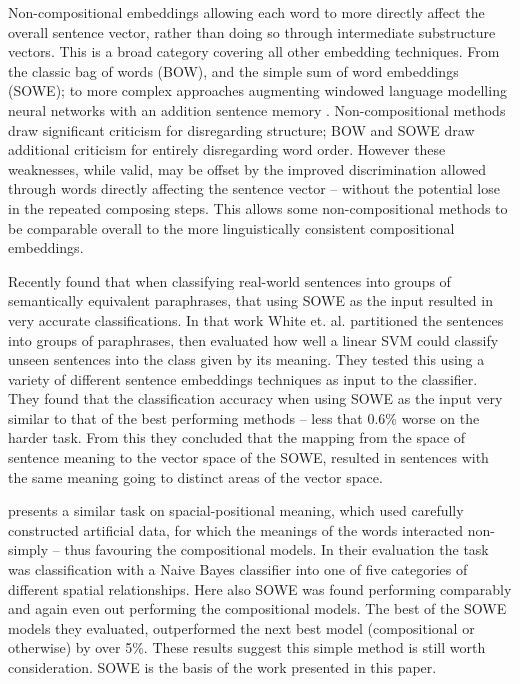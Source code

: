 \documentclass[11pt]{article}
\theoremstyle{plain}
\theoremstyle{definition}
\begin{document}

Non-compositional embeddings allowing each word to more directly affect the overall sentence vector, rather than doing so through intermediate substructure vectors. This is a broad category covering all other embedding techniques. From the classic bag of words (BOW), and the simple sum of word embeddings (SOWE); to more complex approaches augmenting windowed language modelling neural networks with an addition sentence memory \parencite{le2014distributed}.  Non-compositional methods draw significant criticism for disregarding structure; BOW and SOWE draw additional criticism for entirely disregarding word order. However these weaknesses, while valid, may be offset by the improved discrimination allowed through words directly affecting the sentence vector -- without the potential lose in the repeated composing steps. This allows some non-compositional methods to be comparable overall to the more linguistically consistent compositional embeddings. 


Recently \textcite{White2015SentVecMeaning} found that when classifying real-world sentences into groups of semantically equivalent paraphrases, that using SOWE as the input resulted in very accurate classifications. In that work White et. al. partitioned the sentences into groups of paraphrases, then evaluated how well a linear SVM could classify unseen sentences into the class given by its meaning. They tested this using a variety of different sentence embeddings techniques as input to the classifier. They found that the classification accuracy when using SOWE as the input very similar to that of the best performing methods -- less that 0.6\% worse on the harder task. From this they concluded that the mapping from the space of sentence meaning to the vector space of the SOWE, resulted in sentences with the same meaning going to distinct areas of the vector space.

\textcite{RitterPosition} presents a similar task on spacial-positional meaning, which used carefully constructed artificial data, for which the meanings of the words interacted non-simply -- thus favouring the compositional models. In their evaluation the task was classification with a Naive Bayes classifier into one of five categories of different spatial relationships. Here also SOWE was found performing comparably and again even out performing the compositional models. The best of the SOWE models they evaluated, outperformed the next best model (compositional or otherwise) by over 5\%. These results suggest this simple method is still worth consideration. SOWE is the basis of the work presented in this paper.
\end{document}
